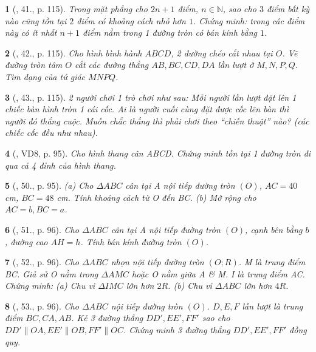 \documentclass{article}
\newtheorem{baitoan}{}
\begin{document}
\begin{baitoan}[\cite{Tuyen_Toan_9_old}, 41., p. 115]
	Trong mặt phẳng cho $2n + 1$ điểm, $n\in\mathbb{N}$, sao cho $3$ điểm bất kỳ nào cũng tồn tại $2$ điểm có khoảng cách nhỏ hơn $1$. Chứng minh: trong các điểm này có ít nhất $n + 1$ điểm nằm trong 1 đường tròn có bán kính bằng $1$.
\end{baitoan}

\begin{baitoan}[\cite{Tuyen_Toan_9_old}, 42., p. 115]
	Cho hình bình hành $ABCD$, 2 đường chéo cắt nhau tại $O$. Vẽ đường tròn tâm $O$ cắt các đường thẳng $AB,BC,CD,DA$ lần lượt ở $M,N,P,Q$. Tìm dạng của tứ giác $MNPQ$.
\end{baitoan}

\begin{baitoan}[\cite{Tuyen_Toan_9_old}, 43., p. 115]
	2 người chơi 1 trò chơi như sau: Mỗi người lần lượt đặt lên 1 chiếc bàn hình tròn 1 cái cốc. Ai là người cuối cùng đặt được cốc lên bàn thì người đó thắng cuộc. Muốn chắc thắng thì phải chơi theo ``chiến thuật'' nào? (các chiếc cốc đều như nhau).
\end{baitoan}

\begin{baitoan}[\cite{Binh_Toan_9_tap_1}, VD8, p. 95]
	Cho hình thang cân ABCD. Chứng minh tồn tại 1 đường tròn đi qua cả 4 đỉnh của hình thang.
\end{baitoan}

\begin{baitoan}[\cite{Binh_Toan_9_tap_1}, 50., p. 95]
	(a) Cho $\Delta ABC$ cân tại A nội tiếp đường tròn $(O)$, $AC = 40$ {\rm cm}, $BC = 48$ {\rm cm}. Tính khoảng cách từ O đến BC. (b) Mở rộng cho $AC = b,BC = a$.
\end{baitoan}

\begin{baitoan}[\cite{Binh_Toan_9_tap_1}, 51., p. 96]
	Cho $\Delta ABC$ cân tại A nội tiếp đường tròn $(O)$, cạnh bên bằng $b$, đường cao $AH = h$. Tính bán kính đường tròn $(O)$.
\end{baitoan}

\begin{baitoan}[\cite{Binh_Toan_9_tap_1}, 52., p. 96]
	Cho $\Delta ABC$ nhọn nội tiếp đường tròn $(O;R)$. M là trung điểm BC. Giả sử O nằm trong $\Delta AMC$ hoặc O nằm giữa A \& M. I là trung điểm AC. Chứng minh: (a) Chu vi $\Delta IMC$ lớn hơn $2R$. (b) Chu vi $\Delta ABC$ lớn hơn $4R$.
\end{baitoan}

\begin{baitoan}[\cite{Binh_Toan_9_tap_1}, 53., p. 96]
	Cho $\Delta ABC$ nội tiếp đường tròn $(O)$. $D,E,F$ lần lượt là trung điểm $BC,CA,AB$. Kẻ 3 đường thẳng $DD',EE',FF'$ sao cho $DD'\parallel OA,EE'\parallel OB,FF'\parallel OC$. Chứng minh 3 đường thẳng $DD',EE',FF'$ đồng quy.
\end{baitoan}
\end{document}
